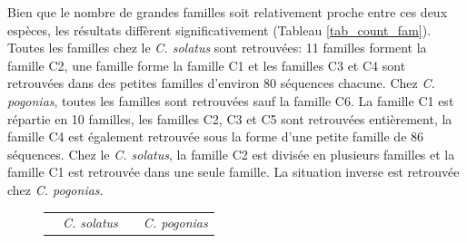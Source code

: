 \documentclass[12pt,a4paper]{article}
\begin{document}
	Bien que le nombre de grandes familles soit relativement proche entre ces deux espèces, les résultats diffèrent significativement (Tableau \ref{tab_count_fam}). Toutes les familles chez le \textit{C. solatus} sont retrouvées: 11 familles forment la famille C2, une famille forme la famille C1 et les familles C3 et C4 sont retrouvées dans des petites familles d'environ 80 séquences chacune. Chez \textit{C. pogonias}, toutes les familles sont retrouvées sauf la famille C6. La famille C1 est répartie en 10 familles, les familles C2, C3 et C5 sont retrouvées entièrement, la famille C4 est également retrouvée sous la forme d'une petite famille de 86 séquences. Chez le \textit{C. solatus}, la famille C2 est divisée en plusieurs familles et la famille C1 est retrouvée dans une seule famille. La situation inverse est retrouvée  chez \textit{C. pogonias}.
		\begin{figure}	
			\begin{tabular}{cc|cc}
				  & \textit{C. solatus} &  &  \textit{C. pogonias}\\

\end{tabular}
\end{figure}
\end{document}
